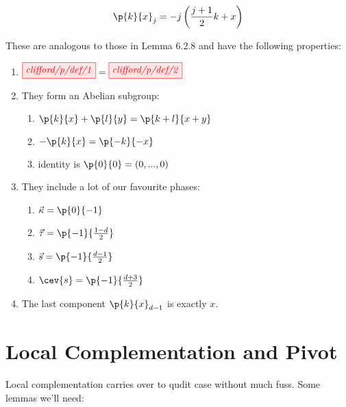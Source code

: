 \documentclass[11pt, oneside]{article}      %
\begin{document}
\begin{equation}
	 \p{k}{x}_j = -j\left(\frac{j+1}{2}k + x\right)
\end{equation} 

These are analogous to those in \cite{Wang_2018}{Lemma 6.2.8} and have the following properties:

\begin{enumerate}
	\item $\tikzfig{clifford/p/def/1} = \tikzfig{clifford/p/def/2}$
	\item They form an Abelian subgroup: 
	\begin{enumerate}
		\item $\p{k}{x} + \p{l}{y} = \p{k+l}{x+y}$
		\item $-\p{k}{x} = \p{-k}{-x}$
		\item identity is $\p{0}{0} = (0, ..., 0)$
	\end{enumerate}
	\item They include a lot of our favourite phases:
	\begin{enumerate}
	 	\item $\vec{\kappa} = \p{0}{-1}$
	 	\item $\vec{\tau} = \p{-1}{\frac{1-d}{2}}$
	 	\item $\vec{s} = \p{-1}{\frac{d-1}{2}}$
	 	\item $\cev{s} = \p{-1}{\frac{d+3}{2}}$
	 \end{enumerate}
	\item The last component $\p{k}{x}_{d-1}$ is exactly $x$.
\end{enumerate}

\section{Local Complementation and Pivot}

Local complementation carries over to qudit case without much fuss. Some lemmas we'll need:
\end{document}
